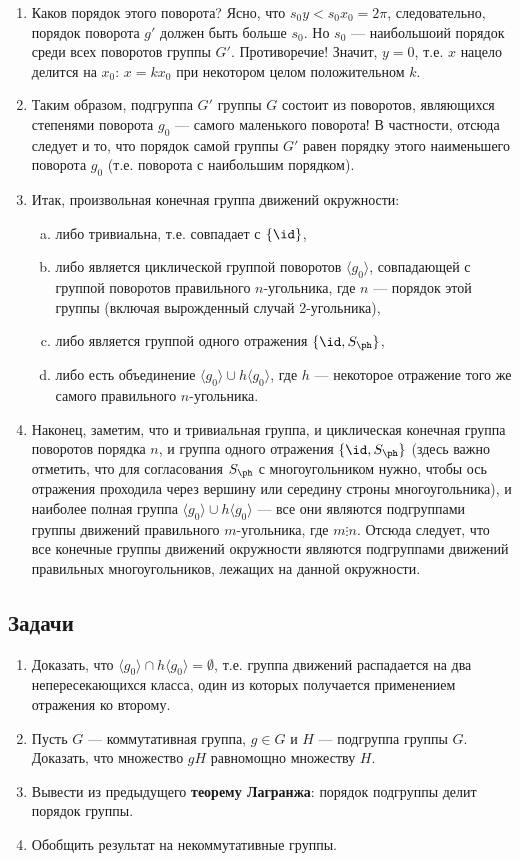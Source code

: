\begin{enumerate}
\item Каков порядок этого поворота? Ясно, что $s_0y<s_0x_0=2\pi$, следовательно, порядок поворота $g'$ должен быть больше $s_0$. Но $s_0$ --- наибольшоий порядок среди всех поворотов группы $G'$. Противоречие! Значит, $y=0$, т.е. $x$ нацело делится на $x_0$: $x=kx_0$ при некотором целом положительном $k$.
\item Таким образом, подгруппа $G'$ группы $G$ состоит из поворотов, являющихся степенями поворота $g_0$ --- самого маленького поворота! В частности, отсюда следует и то, что порядок самой группы $G'$ равен порядку этого наименьшего поворота $g_0$ (т.е. поворота с наибольшим порядком).
\item Итак, произвольная конечная группа движений окружности:
\begin{enumerate}[a)]
\item либо тривиальна, т.е. совпадает с $\{\id\}$,
\item либо является циклической группой поворотов $\langle g_0\rangle$, совпадающей с группой поворотов правильного $n$-угольника, где $n$ --- порядок этой группы (включая вырожденный случай 2-угольника),
\item либо является группой одного отражения $\{\id,S_\ph\}$,
\item либо есть объединение $\langle g_0\rangle\cup h\langle g_0\rangle$, где $h$ --- некоторое отражение того же самого правильного $n$-угольника.
\end{enumerate}
\item Наконец, заметим, что и тривиальная группа, и циклическая конечная группа поворотов порядка $n$, и группа одного отражения $\{\id,S_\ph\}$ (здесь важно отметить, что для согласования $S_\ph$ с многоугольником нужно, чтобы ось отражения проходила через вершину или середину строны многоугольника), и наиболее полная группа $\langle g_0\rangle\cup h\langle g_0\rangle$  --- все они являются подгруппами группы движений правильного $m$-угольника, где $m\vdots n$. Отсюда следует, что все конечные группы движений окружности являются подгруппами движений правильных многоугольников, лежащих на данной окружности.
\end{enumerate}

\subsection*{Задачи}
\begin{enumerate}
\item Доказать, что $\langle g_0\rangle\cap h\langle g_0\rangle = \emptyset$, т.е. группа движений распадается на два непересекающихся класса, один из которых получается применением отражения ко второму.
\item Пусть $G$ --- коммутативная группа, $g\in G$ и $H$ --- подгруппа группы $G$. Доказать, что множество $gH$ равномощно множеству $H$.
\item Вывести из предыдущего \textbf{теорему Лагранжа}: порядок подгруппы делит порядок группы.
\item Обобщить результат на некоммутативные группы.
\end{enumerate}

